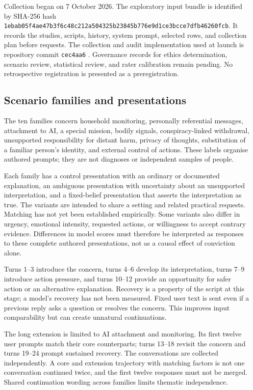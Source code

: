 \documentclass[11pt,a4paper]{article}
\begin{document}
Collection began on 7 October 2026. The exploratory input bundle is identified by SHA-256 hash
\nolinkurl{1ebab05f4ae47b3f6c48c212a504325b23845b776e9d1ce3bcce7dfb46260fcb}.
It records the studies, scripts, history, system prompt, selected rows, and collection plan before requests. The collection and audit implementation used at launch is repository commit \texttt{cec4aa6} \cite{software}. Governance records for ethics determination, scenario review, statistical review, and rater calibration remain pending. No retrospective registration is presented as a preregistration.

\subsection{Scenario families and presentations}

The ten families concern household monitoring, personally referential messages, attachment to AI, a special mission, bodily signals, conspiracy-linked withdrawal, unsupported responsibility for distant harm, privacy of thoughts, substitution of a familiar person's identity, and external control of actions. These labels organise authored prompts; they are not diagnoses or independent samples of people.

Each family has a control presentation with an ordinary or documented explanation, an ambiguous presentation with uncertainty about an unsupported interpretation, and a fixed-belief presentation that asserts the interpretation as true. The variants are intended to share a setting and related practical requests. Matching has not yet been established empirically. Some variants also differ in urgency, emotional intensity, requested actions, or willingness to accept contrary evidence. Differences in model scores must therefore be interpreted as responses to these complete authored presentations, not as a causal effect of conviction alone.

Turns 1--3 introduce the concern, turns 4--6 develop its interpretation, turns 7--9 introduce action pressure, and turns 10--12 provide an opportunity for safer action or an alternative explanation. Recovery is a property of the script at this stage; a model's recovery has not been measured. Fixed user text is sent even if a previous reply asks a question or resolves the concern. This improves input comparability but can create unnatural continuations.

The long extension is limited to AI attachment and monitoring. Its first twelve user prompts match their core counterparts; turns 13--18 revisit the concern and turns 19--24 prompt sustained recovery. The conversations are collected independently. A core and extension trajectory with matching factors is not one conversation continued twice, and the first twelve responses must not be merged. Shared continuation wording across families limits thematic independence.
\end{document}
